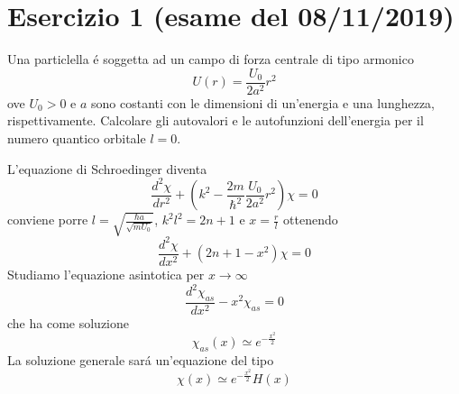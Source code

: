 \documentclass[a4paper]{article}
\begin{document}
    \section*{Esercizio 1 (esame del 08/11/2019)}
        Una particlella \'e soggetta ad un campo di forza centrale di tipo armonico
        \begin{equation*}
            U(r)=\frac{U_0}{2a^2}r^2
        \end{equation*}
        ove $U_0 > 0$ e $a$ sono costanti con le dimensioni di un'energia e una lunghezza, rispettivamente.
        Calcolare gli autovalori e le autofunzioni dell'energia per il numero quantico orbitale $l = 0$.
        \begin{figure}[H]
            \centering
        \end{figure}
        L'equazione di Schroedinger diventa
        \begin{equation*}
            \frac{d^2\chi}{dr^2}+\left(k^2-\frac{2m}{\hbar^2}\frac{U_0}{2a^2}r^2\right)\chi=0
        \end{equation*}
        conviene porre $l=\sqrt{\frac{\hbar a}{\sqrt{mU_0}}}$, $k^2l^2=2n+1$ e $x=\frac{r}{l}$ ottenendo
        \begin{equation*}
            \frac{d^2\chi}{dx^2}+(2n+1-x^2)\chi=0
        \end{equation*}
        Studiamo l'equazione asintotica per $x\to\infty$
        \begin{equation*}
            \frac{d^2\chi_{as}}{dx^2}-x^2\chi_{as}=0
        \end{equation*}
        che ha come soluzione
        \begin{equation*}
            \chi_{as}(x)\simeq e^{-\frac{x^2}{2}}
        \end{equation*}
        La soluzione generale sar\'a un'equazione del tipo
        \begin{equation*}
            \chi(x)\simeq e^{-\frac{x^2}{2}}H(x)
        \end{equation*}
\end{document}
